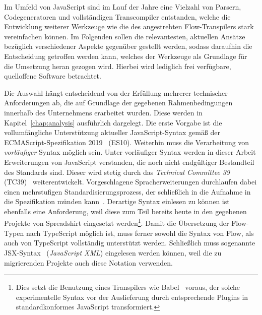 
Im Umfeld von JavaScript sind im Lauf der Jahre eine Vielzahl von Parsern, Codegeneratoren und vollständigen Transcompiler entstanden, welche die Entwicklung weiterer Werkzeuge wie die des angestrebten Flow-Transpilers stark vereinfachen können. Im Folgenden sollen die relevantesten, aktuellen Ansätze bezüglich verschiedener Aspekte gegenüber gestellt werden, sodass daraufhin die Entscheidung getroffen werden kann, welches der Werkzeuge als Grundlage für die Umsetzung heran gezogen wird. Hierbei wird lediglich frei verfügbare, quelloffene Software betrachtet.

Die Auswahl hängt entscheidend von der Erfüllung mehrerer technischer Anforderungen ab, die auf Grundlage der gegebenen Rahmenbedingungen innerhalb des Unternehmens erarbeitet wurden. Diese werden in Kapitel~\ref{chap:analysis} ausführlich dargelegt. Die erste Vorgabe ist die vollumfängliche Unterstützung aktueller JavaScript-Syntax gemäß der ECMAScript-Spezifikation 2019~\autocite{ECMASCRIPT:2019} (ES10). Weiterhin muss die Verarbeitung von \emph{vorläufiger} Syntax möglich sein. Unter vorläufiger Syntax werden in dieser Arbeit Erweiterungen von JavaScript verstanden, die noch nicht endgültiger Bestandteil des Standards sind. Dieser wird stetig durch das \textit{Technical Committee 39} (TC39)~\autocite{TC39_COMMITTEE} weiterentwickelt. Vorgeschlagene Spracherweiterungen durchlaufen dabei einen mehrstufigen Standardisierungsprozess, der schließlich in die Aufnahme in die Spezifikation münden kann~\autocite{TC39_PROCESS}. Derartige Syntax einlesen zu können ist ebenfalls eine Anforderung, weil diese zum Teil bereits heute in den gegebenen Projekte von Spreadshirt eingesetzt werden\footnote{Dies setzt die Benutzung eines Transpilers wie Babel~\autocite{BABEL} voraus, der solche experimentelle Syntax vor der Auslieferung durch entsprechende Plugins in standardkonformes JavaScript transformiert.}. Damit die Übersetzung der Flow-Typen nach TypeScript möglich ist, muss ferner sowohl die Syntax von Flow, als auch von TypeScript vollständig unterstützt werden. Schließlich muss sogenannte JSX-Syntax~\autocite{SOFTWARE:JSX} (\textit{JavaScript XML}) eingelesen werden können, weil die zu migrierenden Projekte auch diese Notation verwenden.


